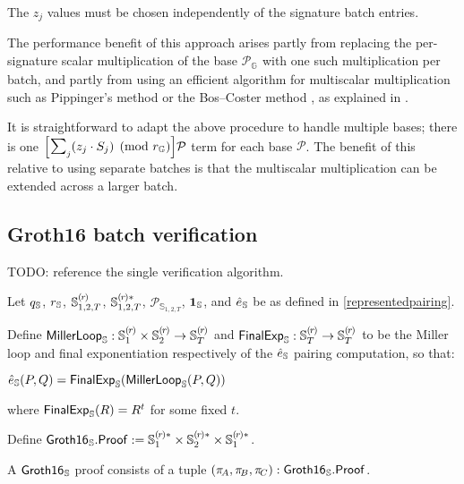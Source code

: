 \documentclass{article}
\newcommand{\crossref}[1]{\autoref{#1}}
\newcommand{\typecolon}{:}
\newcommand{\sop}[3]{\!\scalebox{0.89}{$\scalebox{1.404}{$\strut#3$}_{#1}^{#2}$}}
\newcommand{\ssum}[2]{\sop{#1}{#2}{\sum}}
\newcommand{\mult}{\cdot}
\newcommand{\Bigscalarmult}[2]{\Big[{#1}\Big]{#2}}
\newcommand{\RedDSASigS}[1]{S_{#1}}
\newcommand{\Groth}{\mathsf{Groth16}}
\newcommand{\GrothS}{\Groth_{\kern 0.05em\mathbb{S}}}
\newcommand{\GrothSProof}{\GrothS\mathsf{.Proof}}
\newcommand{\Proof}[1]{\pi_{\!{#1}}}
\newcommand{\Generator}{\mathcal{P}}
\newcommand{\subgroupr}{(\kern-0.075emr\kern-0.075em)}
\newcommand{\ParamG}[1]{{{#1}_\mathbb{G}}}
\newcommand{\GroupG}[1]{\mathbb{G}_{#1}}
\newcommand{\GenG}[1]{\Generator_{\GroupG{#1}}}
\newcommand{\ParamS}[1]{{{#1}_\mathbb{\hskip 0.03em S}}}
\newcommand{\GroupS}[1]{\mathbb{S}_{#1}}
\newcommand{\SubgroupS}[1]{\GroupS{#1}^{\subgroupr}}
\newcommand{\SubgroupSstar}[1]{\GroupS{#1}^{\subgroupr\ast}}
\newcommand{\OneS}{\ParamS{\mathbf{1}}}
\newcommand{\GenS}[1]{\Generator_{\GroupS{#1}}}
\newcommand{\PairingS}{\ParamS{\hat{e}}}
\newcommand{\MillerLoopS}{\ParamS{\mathsf{MillerLoop}}}
\newcommand{\FinalExpS}{\ParamS{\mathsf{FinalExp}}}
\begin{document}
The $z_j$ values must be chosen independently of the signature batch entries.

The performance benefit of this approach arises partly from replacing the per-signature
scalar multiplication of the base $\GenG{}$ with one such multiplication per batch,
and partly from using an efficient algorithm for multiscalar multiplication such
as Pippinger's method \cite{Bernstein2001} or the Bos--Coster method \cite{deRooij1995}, as explained in
\cite[section 5]{BDLSY2012}.

It is straightforward to adapt the above procedure to handle multiple bases;
there is one
$\Bigscalarmult{\ssum{j}{}{(z_j \mult \RedDSASigS{j}) \pmod{\ParamG{r}}}}{\Generator}$ term for each base $\Generator$.
The benefit of this relative to using separate batches is that the multiscalar multiplication
can be extended across a larger batch.


\subsection{Groth16 batch verification} \label{grothbatchverify}

TODO: reference the single verification algorithm.

Let $\ParamS{q}$, $\ParamS{r}$, $\SubgroupS{1, 2, T}$, $\SubgroupSstar{1, 2, T}$, $\GenS{1, 2, T}$,
$\OneS$, and $\PairingS$ be as defined in \crossref{representedpairing}.

Define $\MillerLoopS \typecolon \SubgroupS{1} \times \SubgroupS{2} \rightarrow \SubgroupS{T}$
and $\FinalExpS \typecolon \SubgroupS{T} \rightarrow \SubgroupS{T}$ to be the Miller loop and
final exponentiation respectively of the $\PairingS$ pairing computation, so that:
\begin{formulae}
  \item $\PairingS(P, Q) = \FinalExpS(\MillerLoopS(P, Q))$
\end{formulae}
where $\FinalExpS(R) = R^{t}$ for some fixed $t$.

Define $\GrothSProof := \SubgroupSstar{1} \times \SubgroupSstar{2} \times \SubgroupSstar{1}$.

A $\GrothS$ proof consists of a tuple $(\Proof{A}, \Proof{B}, \Proof{C}) \typecolon \GrothSProof$.
\end{document}
